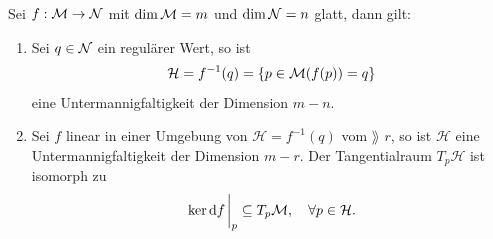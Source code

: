 \begin{kor}
Sei $f: \mathcal{M} \to \mathcal{N}$ mit $\dim \mathcal{M} = m$ und $\dim \mathcal{N} = n$ glatt, dann gilt:
\begin{enumerate}
\item Sei $q \in \mathcal{N}$ ein regulärer Wert, so ist 
\begin{align}
\mathcal{H} = f^{-1}(q) = \{ p \in \mathcal{M} (f(p))=q \}
\end{align}
eine Untermannigfaltigkeit der Dimension $m-n$.
\item Sei $f$ linear in einer Umgebung von $\mathcal{H} = f^{-1}(q)$ vom $\rang$ $r$, so ist $\mathcal{H}$ eine Untermannigfaltigkeit der Dimension $m-r$.
Der Tangentialraum $T_p \mathcal{H}$ ist isomorph zu
\begin{align}
\ker \dd f \eval_p \subseteq \tspace{p}, \quad \forall p \in \mathcal{H}.
\end{align}
\end{enumerate} 
\end{kor}

